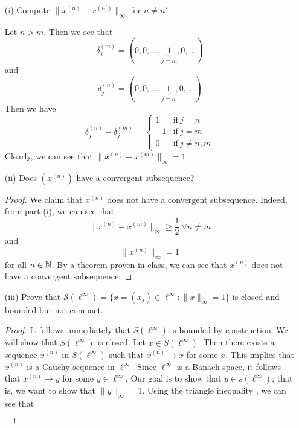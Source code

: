 \documentclass[a4paper]{article}
\begin{document}
\begin{enumerate}
    \item[(i)] Compute \( \|x^{(n)} - x^{(n')}\|_{\infty} \) for \( n \neq n' \).
        \begin{solution}
        Let \( n > m  \). Then we see that 
        \[  {\delta}_{j}^{(m)} = (0,0, \dots, \underbrace{1}_{j=m}, 0, \dots) \]
        and 
        \[  {\delta}_{j}^{(n)} =  (0,0, \dots, \underbrace{1}_{j=n}, 0, \dots)\]
        Then we have 
        \[ {\delta}_{j}^{(n)} - {\delta}_{j}^{(m)} = 
        \begin{cases}
            1 &\text{if} \ j = n \\
            -1 &\text{if} \ j = m \\
            0 &\text{if} \ j \neq n,m
        \end{cases}  \]
        Clearly, we can see that \( \|x^{(n)} - x^{(m)} \|_{\infty} = 1  \).
        \end{solution}
    \item[(ii)] Does \( (x^{(n)}) \) have a convergent subsequence?
        \begin{proof}
        We claim that \( x^{(n)} \) does not have a convergent subsequence. Indeed, from part (i), we can see that 
        \[  \|x^{(n)} - x^{(m)}\|_{\infty } \geq \frac{ 1 }{ 2 } \ \forall n \neq m  \]
        and 
        \[  \|x^{(n)}\|_{\infty } = 1 \] 
        for all \( n \in \mathbb{N} \). By a theorem proven in class, we can see that \( x^{(n)} \) does not have a convergent subsequence.
        \end{proof}
    \item[(iii)] Prove that \( \mathcal{S}(\ell^{\infty }) = \{ x = ({x}_{j}) \in \ell^{\infty } : \|x\|_{\infty } = 1  \}  \) is closed and bounded but not compact.
        \begin{proof}
            It follows immediately that \( S(\ell^{\infty }) \) is bounded by construction. We will show that \( S(\ell^{\infty }) \) is closed. Let \( x \in \overline{S(\ell^{\infty })} \). Then there exists a sequence \( x^{(n)} \) in \( S(\ell^{\infty }) \) such that \( x^{(n)} \to x  \) for some \( x \). This implies that \( x^{(n)} \) is a Cauchy sequence in \( \ell^{\infty } \). Since \( \ell^{\infty } \) is a Banach space, it follows that \( x^{(n)} \to y  \) for some \( y \in \ell^{\infty } \). Our goal is to show that \( y \in s(\ell^{\infty }) \); that is, we want to show that \( \|y\|_{\infty } = 1 \). Using the triangle inequality , we can see that 
            \begin{align*}

\end{align*}
\end{proof}
\end{enumerate}
\end{document}
